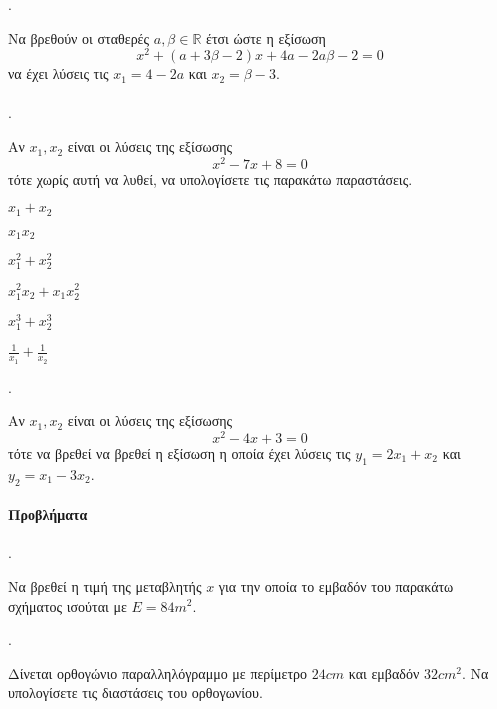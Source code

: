 \documentclass[11pt,a4paper,twocolumn]{article}
\newcounter{askhsh}
\newcommand{\askhsh}{{\large\theaskhsh.}\ \addtocounter{askhsh}{1}}
\begin{document}
\askhsh
Να βρεθούν οι σταθερές $ a, \beta\in\mathbb{R} $ έτσι ώστε η εξίσωση
 \[ x^2+(a+3\beta-2)x+4a-2a\beta-2=0 \]
να έχει λύσεις τις $ x_1=4-2a $ και $ x_2=\beta-3 $.\\\\
\askhsh
Αν $ x_1,x_2 $ είναι οι λύσεις της εξίσωσης
\[ x^2-7x+8=0 \]
τότε χωρίς αυτή να λυθεί, να υπολογίσετε τις παρακάτω παραστάσεις.
\begin{multicols}{2}
\begin{alist}
\item $ x_1+x_2 $
\item $ x_1x_2 $
\item $ x_1^2+x_2^2 $
\item $ x_1^2x_2+x_1x_2^2 $
\item $ x_1^3+x_2^3 $
\item $ \frac{1}{x_1}+\frac{1}{x_2} $
\end{alist}
\end{multicols}
\askhsh
Αν $ x_1,x_2 $ είναι οι λύσεις της εξίσωσης \[ x^2-4x+3=0 \] τότε να βρεθεί να βρεθεί η εξίσωση η οποία έχει λύσεις τις $ y_1=2x_1+x_2 $ και $ y_2=x_1-3x_2 $.
\paragraph{Προβλήματα}
\askhsh
Να βρεθεί η τιμή της μεταβλητής $ x $ για την οποία το εμβαδόν του παρακάτω σχήματος ισούται με $ E=84m^2 $.
\begin{center}
\end{center}
\askhsh Δίνεται ορθογώνιο παραλληλόγραμμο με περίμετρο $24\si{cm}$ και εμβαδόν $32\si{cm}^2$. Να υπολογίσετε τις διαστάσεις του ορθογωνίου.
\end{document}

